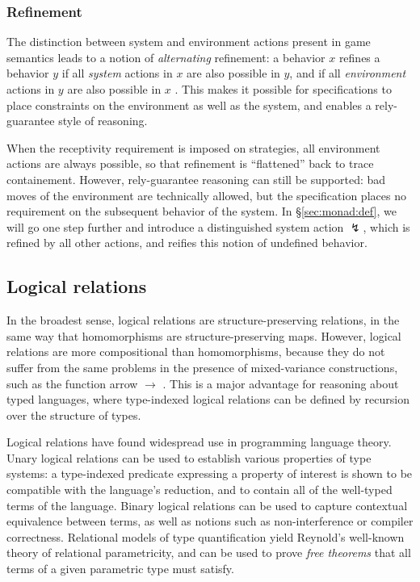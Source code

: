 \documentclass[acmsmall,timestamp,review,anonymous]{acmart}
\begin{document}

\subsubsection{Refinement} \label{sec:mainideas:gs:ref} %

The distinction between system and environment actions
present in game semantics
leads to a notion of \emph{alternating} refinement:
a behavior $x$ refines a behavior $y$ if
all \emph{system} actions in $x$ are also possible in $y$, and if
all \emph{environment} actions in $y$ are also possible in $x$
\cite{altref,gmos}.
This makes it possible for specifications to
place constraints on the environment as well as the system,
and enables a rely-guarantee style of reasoning.

When the receptivity requirement is imposed on strategies,
all environment actions are always possible,
so that refinement is ``flattened'' back to trace containement.
However,
rely-guarantee reasoning can still be supported:
bad moves of the environment are technically allowed,
but the specification places no requirement on
the subsequent behavior of the system.
In \S\ref{sec:monad:def},
we will go one step further and introduce a distinguished
system action $\lightning$,
which is refined by all other actions,
and reifies this notion of undefined behavior.



\subsection{Logical relations} %

In the broadest sense,
logical relations are structure-preserving relations,
in the same way that homomorphisms are structure-preserving maps.
However,
logical relations are more compositional than homomorphisms,
because they do not suffer from the same problems
in the presence of mixed-variance constructions,
such as the function arrow $\rightarrow$ \cite{lrp}.
This is a major advantage
for reasoning about typed languages,
where type-indexed logical relations
can be defined by recursion over the structure of types.

Logical relations have found widespread use in programming language theory.
Unary logical relations can be used to establish
various properties of type systems:
a type-indexed predicate expressing a property of interest
is shown to be compatible with the language's reduction,
and to contain all of the well-typed terms of the language.
Binary logical relations can be used to capture
contextual equivalence between terms,
as well as notions such as non-interference or compiler correctness.
Relational models of type quantification yield
Reynold's well-known theory of relational parametricity,
and can be used to prove \emph{free theorems} that
all terms of a given parametric type must satisfy.
\end{document}
